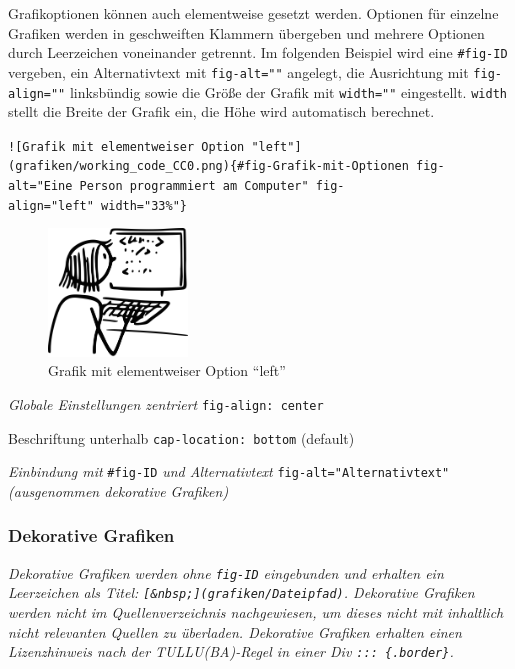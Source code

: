 \documentclass[
  letterpaper,
  DIV=11]{scrartcl}
\providecommand{\tightlist}{%
  \setlength{\itemsep}{0pt}\setlength{\parskip}{0pt}}\usepackage{longtable,booktabs,array}
\begin{document}
Grafikoptionen können auch elementweise gesetzt werden. Optionen für
einzelne Grafiken werden in geschweiften Klammern übergeben und mehrere
Optionen durch Leerzeichen voneinander getrennt. Im folgenden Beispiel
wird eine \texttt{\#fig-ID} vergeben, ein Alternativtext mit
\texttt{fig-alt=""} angelegt, die Ausrichtung mit \texttt{fig-align=""}
linksbündig sowie die Größe der Grafik mit \texttt{width=""}
eingestellt. \texttt{width} stellt die Breite der Grafik ein, die Höhe
wird automatisch berechnet.

\texttt{!{[}Grafik\ mit\ elementweiser\ Option\ "left"{]}(grafiken/working\_code\_CC0.png)\{\#fig-Grafik-mit-Optionen\ fig-alt="Eine\ Person\ programmiert\ am\ Computer"\ fig-align="left"\ width="33\%"\}}

\begin{figure}

\includegraphics[width=0.33\textwidth,height=\textheight]{grafiken/working_code_CC0.png}

\caption{\label{fig-Grafik-mit-Optionen}Grafik mit elementweiser Option
``left''}

\end{figure}%

\begin{description}
\tightlist
\item[Grafiken]
\emph{Globale Einstellungen zentriert} \texttt{fig-align:\ center}

Beschriftung unterhalb \texttt{cap-location:\ bottom} (default)

\emph{Einbindung mit} \texttt{\#fig-ID} \emph{und Alternativtext}
\texttt{fig-alt="Alternativtext"} \emph{(ausgenommen dekorative
Grafiken)}
\end{description}

\subsubsection{Dekorative Grafiken}\label{dekorative-grafiken}

\emph{Dekorative Grafiken werden ohne \texttt{fig-ID} eingebunden und
erhalten ein Leerzeichen als Titel:
\texttt{{[}\&nbsp;{]}(grafiken/Dateipfad)}. Dekorative Grafiken werden
nicht im Quellenverzeichnis nachgewiesen, um dieses nicht mit inhaltlich
nicht relevanten Quellen zu überladen. Dekorative Grafiken erhalten
einen Lizenzhinweis nach der TULLU(BA)-Regel in einer Div
\texttt{:::\ \{.border\}}.}
\end{document}
